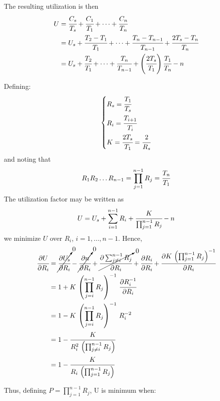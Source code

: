 The resulting utilization is then
\begin{align*}
    U &= \cfrac{C_s}{T_s} + \cfrac{C_1}{T_1} + \dots + \cfrac{C_n}{T_n}\\
    &= U_s + \cfrac{T_2 - T_1}{T_1} + \dots + \cfrac{T_n - T_{n-1}}{T_{n-1}} + \cfrac{2T_s - T_n}{T_n}\\
    &= U_s + \cfrac{T_2}{T_1} + \dots + \cfrac{T_n}{T_{n-1}} + \left(\cfrac{2T_s}{T_1}\right) \cfrac{T_1}{T_n} - n 
\end{align*}

Defining:
\[
    \begin{dcases}
        R_s = \cfrac{T_1}{T_s}\\
        R_i = \cfrac{T_{i+1}}{T_i}\\
        K = \cfrac{2T_s}{T_1} = \cfrac{2}{R_s}
    \end{dcases}
\]
and noting that 
\[R_1R_2\dots R_{n-1} = \prod_{j=1}^{n-1}R_j = \cfrac{T_n}{T_1}\]
The utilization factor may be written as
\[U = U_s + \sum_{i=1}^{n-1}R_i + \cfrac{K}{\prod_{j=1}^{n-1}R_j} - n\]
we minimize $U$ over $R_i$, $i = 1,\dots,n-1$. Hence,
\begin{align*}
    \cfrac{\partial U}{\partial R_i} &= \cancelto{0}{\cfrac{\partial U_s}{\partial R_i}} - \cancelto{0}{\cfrac{\partial n}{\partial R_i}} + \cancelto{0}{\cfrac{\partial\sum_{j\ne i}^{n-1} R_j}{\partial R_i}} + \cfrac{\partial R_i}{\partial R_i} + \cfrac{\partial K\,\left(\prod_{j=1}^{n-1}R_j\right)^{-1}}{\partial R_i}\\
    &= 1 + K\,\left(\prod_{j=i}^{n-1}R_j\right)^{-1}\,\cfrac{\partial R_i^{-1}}{\partial R_i}\\
    &= 1 - K\,\left(\prod_{j=i}^{n-1}R_j\right)^{-1}\,R_i^{-2}\\
    &= 1 - \cfrac{K}{R_i^2\,\left(\prod_{j\ne i}^{n-1}R_j\right)}\\
    &= 1 - \cfrac{K}{R_i \, \left(\prod_{j=1}^{n-1}R_j\right)}
\end{align*}

Thus, defining $P= \prod_{j=1}^{n-1}R_j$, U is minimum when:

